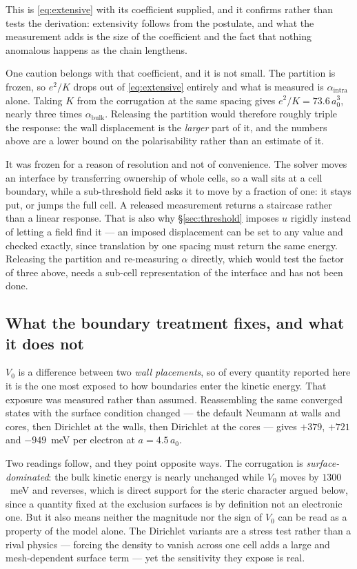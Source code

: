 \documentclass[11pt]{article}
\begin{document}
This is \eqref{eq:extensive} with its coefficient supplied, and it confirms rather than tests the
derivation: extensivity follows from the postulate, and what the measurement adds is the size of
the coefficient and the fact that nothing anomalous happens as the chain lengthens.

One caution belongs with that coefficient, and it is not small. The partition is frozen, so
$e^2/K$ drops out of \eqref{eq:extensive} entirely and what is measured is $\alpha_{\text{intra}}$
alone. Taking $K$ from the corrugation at the same spacing gives $e^2/K = 73.6\,a_0^3$,
nearly three times $\alpha_{\text{bulk}}$. Releasing the partition would therefore roughly triple
the response: the wall displacement is the \emph{larger} part of it, and the numbers above are a
lower bound on the polarisability rather than an estimate of it.

It was frozen for a reason of resolution and not of convenience. The solver moves an interface by
transferring ownership of whole cells, so a wall sits at a cell boundary, while a sub-threshold field
asks it to move by a fraction of one: it stays put, or jumps the full cell. A released measurement
returns a staircase rather than a linear response. That is also why \S\ref{sec:threshold} imposes
$u$ rigidly instead of letting a field find it --- an imposed displacement can be set to any value
and checked exactly, since translation by one spacing must return the same energy. Releasing the
partition and re-measuring $\alpha$ directly, which would test the factor of three above, needs a
sub-cell representation of the interface and has not been done.

\subsection{What the boundary treatment fixes, and what it does not}

$V_0$ is a difference between two \emph{wall placements}, so of every quantity reported here it is
the one most exposed to how boundaries enter the kinetic energy. That exposure was measured rather
than assumed. Reassembling the same converged states with the surface condition changed --- the
default Neumann at walls and cores, then Dirichlet at the walls, then Dirichlet at the cores ---
gives $+379$, $+721$ and $-949$~meV per electron at $a=4.5\,a_0$.

Two readings follow, and they point opposite ways. The corrugation is \emph{surface-dominated}: the
bulk kinetic energy is nearly unchanged while $V_0$ moves by $1300$~meV and reverses, which is
direct support for the steric character argued below, since a quantity fixed at the exclusion
surfaces is by definition not an electronic one. But it also means neither the magnitude nor the
sign of $V_0$ can be read as a property of the model alone. The Dirichlet variants are a stress
test rather than a rival physics --- forcing the density to vanish across one cell adds a large and
mesh-dependent surface term --- yet the sensitivity they expose is real.
\end{document}
